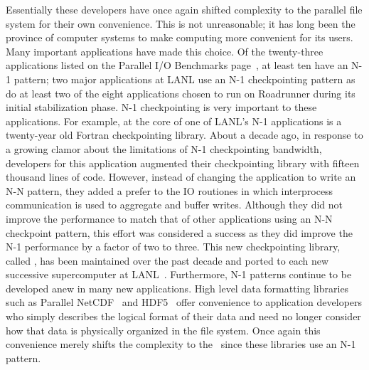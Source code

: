 Essentially these developers have once again shifted complexity to the parallel
file system for their own convenience.  This is not unreasonable; it has long
been the province of computer systems to make computing more convenient for its
users.  Many important applications have made this choice.  Of the twenty-three
applications listed on the Parallel I/O Benchmarks page~\cite{pio-benchmarks},
at least ten have an N-1 pattern; two major applications at LANL use an N-1
checkpointing pattern as do at least two of the eight applications chosen to
run on Roadrunner during its initial stabilization phase.  N-1 checkpointing is
very important to these applications.  For example, at the core of one of
LANL's N-1 applications is a twenty-year old Fortran checkpointing library. 
About a decade ago, in response to a growing clamor about the
limitations of N-1 checkpointing bandwidth, developers for this application
augmented their checkpointing library with fifteen thousand lines of code.
However, instead of changing the application to write an N-N pattern, they
added a prefer to the IO routiones in which interprocess communication is used to aggregate and buffer writes.
Although they did not improve the performance to match that of other 
applications using an N-N checkpoint pattern, 
this effort was considered a success as they did improve the N-1
performance by a factor of two to three. This new checkpointing library,
called , has been maintained over the past decade and ported to
each new successive supercomputer at LANL~\cite{bent-personal-bulk}. 
Furthermore, N-1 patterns continue to be developed anew in many new
applications.  High level data formatting libraries such as Parallel
NetCDF~\cite{pnetcdf} and HDF5~\cite{hdf5} offer convenience to application
developers who simply describes the logical format of their data and need no
longer consider how that data is physically organized in the file system.  Once
again this convenience merely shifts the complexity to the \upfs\ 
since these libraries use an N-1 pattern.


